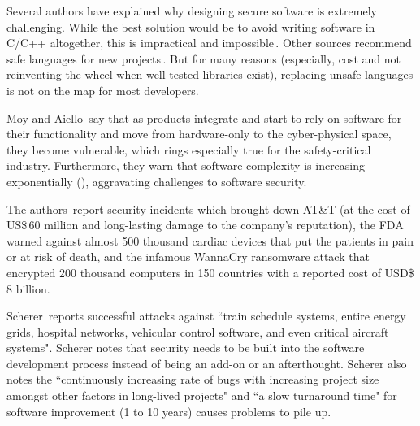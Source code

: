 \documentclass[nomenclature, english, bibtex]{kththesis}
\begin{document}
Several authors have explained why designing secure software is extremely challenging. While the best solution would be to avoid writing software in C/C++ altogether, this is impractical and impossible\,\cite{szekeres_sok_2013}. Other sources recommend safe languages for new projects\,\cite{scherer_engineering_2021}. But for many reasons (especially, cost and not reinventing the wheel when well-tested libraries exist), replacing unsafe languages is not on the map for most developers.

Moy and Aiello\,\cite{moy_when_2020} say that as products integrate and start to rely on software for their functionality and move from hardware-only to the cyber-physical space, they become vulnerable, which rings especially true for the \gls{safety-critical} industry. Furthermore, they warn that software complexity is increasing exponentially (\cite{moy_when_2020}), aggravating challenges to software security.

The authors\,\cite{moy_when_2020} report security incidents which brought down AT\&T (at the cost of US\$\,60 million and long-lasting damage to the company's reputation), the \gls{FDA} warned against almost 500 thousand cardiac devices that put the patients in pain or at risk of death, and the infamous WannaCry ransomware attack that encrypted 200 thousand computers in 150 countries with a reported cost of USD\$\,8 billion.

Scherer\,\cite{scherer_engineering_2021} reports successful attacks against ``train schedule systems, entire energy grids, hospital networks, vehicular control software, and even critical aircraft systems". Scherer notes that security needs to be built into the software development process instead of being an add-on or an afterthought. Scherer also notes the ``continuously increasing rate of bugs with increasing project size amongst other factors in long-lived projects" and ``a slow turnaround time" for software improvement (1 to 10 years) causes problems to pile up.
\end{document}
